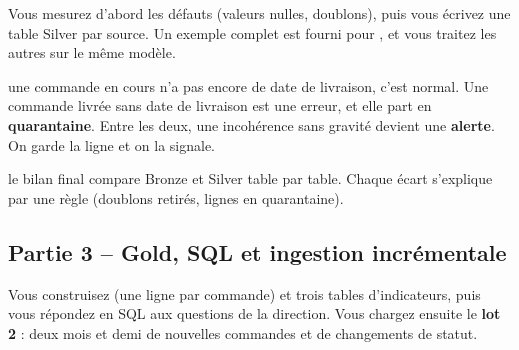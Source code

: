 Vous mesurez d'abord les défauts (valeurs nulles, doublons), puis vous écrivez une table Silver par
source. Un exemple complet est fourni pour , et vous traitez les autres sur le même modèle.

\begin{notion}
une commande en cours n'a pas encore de date
de livraison, c'est normal. Une commande \og livrée \fg{} sans date de livraison est une erreur, et
elle part en \textbf{quarantaine}. Entre les deux, une incohérence sans gravité devient une
\textbf{alerte}. On garde la ligne et on la signale.
\end{notion}

\begin{resultat}
le bilan final compare Bronze et Silver table par table. Chaque écart s'explique par une règle
(doublons retirés, lignes en quarantaine).
\end{resultat}


\subsection*{Partie 3 -- Gold, SQL et ingestion incrémentale \hfill {}}

Vous construisez  (une ligne par commande) et trois tables d'indicateurs,
puis vous répondez en SQL aux questions de la direction. Vous chargez ensuite le \textbf{lot 2} :
deux mois et demi de nouvelles commandes et de changements de statut.

